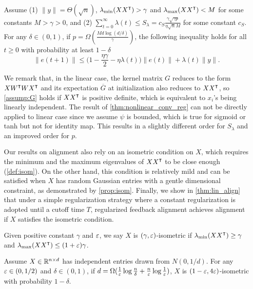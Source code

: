 \begin{theorem}
\label{thm:lin_conv}
Assume \textnormal{(1)}  $\|y\| = \Theta(\sqrt n)$, $\lambda_{\min}(XX\transpose)>\gamma$ and $\lambda_{\max}(XX\transpose)<M$ for some constants $M>\gamma>0$, and \textnormal{(2)} $\sum_{t=0}^\infty \lambda(t) \leq  S_\lambda = c_{S}\frac{\gamma\sqrt{\gamma p}}{\eta\sqrt{n}M}$ for some constant $c_{S}$.
For any $\delta\in(0,1)$, if $p = \Omega(\frac{Md\log(d/\delta)}{\gamma})$, the following inequality holds for all $t\geq 0$ with probability at least $1-\delta$
\begin{equation}
\label{eq:reg_error_bd}
\|e(t+1)\|\leq \big(1-\frac{\eta\gamma}{2}-\eta\lambda(t)\big)\|e(t)\| + \lambda(t)\|y\|.
\end{equation} 
\end{theorem}

We remark that, in the linear case, the kernel matrix $G$ reduces to the form $X W\transpose W X\transpose$ and its expectation $\overline{G}$ at initialization also reduces to $X X\transpose$, so \cref{assump:G} holds if $XX\transpose$ is positive definite, which is equivalent to $x_i$'s being linearly independent. The result of \cref{thm:nonlinear_conv_reg} can not be directly applied to linear case since we assume $\psi$ is bounded, which is true for sigmoid or tanh but not for identity map. This results in a slightly different order for $S_\lambda$ and an improved order for $p$.

Our results on alignment also rely on an isometric condition on $X$, which requires the minimum and the maximum eigenvalues of $XX\transpose$ to be close enough (\cf \cref{def:isom}). On the other hand, this condition is relatively mild and can be satisfied when $X$ has random Gaussian entries with a gentle dimensional constraint, as demonstrated by \cref{prop:isom}. Finally, we show in \cref{thm:lin_align} that under a simple regularization strategy where a constant regularization is adopted until a cutoff time $T$, regularized feedback alignment achieves alignment if $X$ satisfies the isometric condition.
{}
\begin{definition}
\label{def:isom}
Given positive constant $\gamma$ and $\varepsilon$, we say $X$ is $(\gamma, \varepsilon)$-isometric if 
$\lambda_{\min}(XX\transpose)\geq\gamma$ and $\lambda_{\max}(XX\transpose)\leq(1+\eps)\gamma$.
\end{definition}

\begin{proposition}
\label{prop:isom}
Assume $X\in\mathbb{R}^{n\times d}$ has independent entries drawn from $N(0,1/d)$. For any $\varepsilon \in (0,1/2)$ and $\delta \in (0,1)$, if $d=\Omega(\frac{1}{\varepsilon}\log\frac{n}{\delta}+\frac{n}{\varepsilon}\log \frac{1}{\varepsilon})$, $X$ is $(1-\varepsilon, 4\varepsilon)$-isometric with probability $1-\delta$.
\end{proposition}

